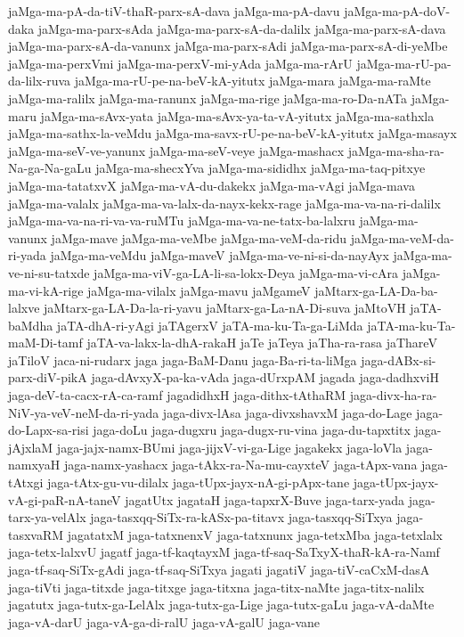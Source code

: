 {jaMga-ma-pA-da-tiV-thaR-parx-sA-dava
jaMga-ma-pA-davu
jaMga-ma-pA-doV-daka
jaMga-ma-parx-sAda
jaMga-ma-parx-sA-da-dalilx
jaMga-ma-parx-sA-dava
jaMga-ma-parx-sA-da-vanunx
jaMga-ma-parx-sAdi
jaMga-ma-parx-sA-di-yeMbe
jaMga-ma-perxVmi
jaMga-ma-perxV-mi-yAda
jaMga-ma-rArU
jaMga-ma-rU-pa-da-lilx-ruva
jaMga-ma-rU-pe-na-beV-kA-yitutx
jaMga-mara
jaMga-ma-raMte
jaMga-ma-ralilx
jaMga-ma-ranunx
jaMga-ma-rige
jaMga-ma-ro-Da-nATa
jaMga-maru
jaMga-ma-sAvx-yata
jaMga-ma-sAvx-ya-ta-vA-yitutx
jaMga-ma-sathxla
jaMga-ma-sathx-la-veMdu
jaMga-ma-savx-rU-pe-na-beV-kA-yitutx
jaMga-masayx
jaMga-ma-seV-ve-yanunx
jaMga-ma-seV-veye
jaMga-mashacx
jaMga-ma-sha-ra-Na-ga-Na-gaLu
jaMga-ma-shecxYva
jaMga-ma-sididhx
jaMga-ma-taq-pitxye
jaMga-ma-tatatxvX
jaMga-ma-vA-du-dakekx
jaMga-ma-vAgi
jaMga-mava
jaMga-ma-valalx
jaMga-ma-va-lalx-da-nayx-kekx-rage
jaMga-ma-va-na-ri-dalilx
jaMga-ma-va-na-ri-va-va-ruMTu
jaMga-ma-va-ne-tatx-ba-lalxru
jaMga-ma-vanunx
jaMga-mave
jaMga-ma-veMbe
jaMga-ma-veM-da-ridu
jaMga-ma-veM-da-ri-yada
jaMga-ma-veMdu
jaMga-maveV
jaMga-ma-ve-ni-si-da-nayAyx
jaMga-ma-ve-ni-su-tatxde
jaMga-ma-viV-ga-LA-li-sa-lokx-Deya
jaMga-ma-vi-cAra
jaMga-ma-vi-kA-rige
jaMga-ma-vilalx
jaMga-mavu
jaMgameV
jaMtarx-ga-LA-Da-ba-lalxve
jaMtarx-ga-LA-Da-la-ri-yavu
jaMtarx-ga-La-nA-Di-suva
jaMtoVH
jaTA-baMdha
jaTA-dhA-ri-yAgi
jaTAgerxV
jaTA-ma-ku-Ta-ga-LiMda
jaTA-ma-ku-Ta-maM-Di-tamf
jaTA-va-lakx-la-dhA-rakaH
jaTe
jaTeya
jaTha-ra-rasa
jaThareV
jaTiloV
jaca-ni-rudarx
jaga
jaga-BaM-Danu
jaga-Ba-ri-ta-liMga
jaga-dABx-si-parx-diV-pikA
jaga-dAvxyX-pa-ka-vAda
jaga-dUrxpAM
jagada
jaga-dadhxviH
jaga-deV-ta-cacx-rA-ca-ramf
jagadidhxH
jaga-dithx-tAthaRM
jaga-divx-ha-ra-NiV-ya-veV-neM-da-ri-yada
jaga-divx-lAsa
jaga-divxshavxM
jaga-do-Lage
jaga-do-Lapx-sa-risi
jaga-doLu
jaga-dugxru
jaga-dugx-ru-vina
jaga-du-tapxtitx
jaga-jAjxlaM
jaga-jajx-namx-BUmi
jaga-jijxV-vi-ga-Lige
jagakekx
jaga-loVla
jaga-namxyaH
jaga-namx-yashacx
jaga-tAkx-ra-Na-mu-cayxteV
jaga-tApx-vana
jaga-tAtxgi
jaga-tAtx-gu-vu-dilalx
jaga-tUpx-jayx-nA-gi-pApx-tane
jaga-tUpx-jayx-vA-gi-paR-nA-taneV
jagatUtx
jagataH
jaga-tapxrX-Buve
jaga-tarx-yada
jaga-tarx-ya-velAlx
jaga-tasxqq-SiTx-ra-kASx-pa-titavx
jaga-tasxqq-SiTxya
jaga-tasxvaRM
jagatatxM
jaga-tatxnenxV
jaga-tatxnunx
jaga-tetxMba
jaga-tetxlalx
jaga-tetx-lalxvU
jagatf
jaga-tf-kaqtayxM
jaga-tf-saq-SaTxyX-thaR-kA-ra-Namf
jaga-tf-saq-SiTx-gAdi
jaga-tf-saq-SiTxya
jagati
jagatiV
jaga-tiV-caCxM-dasA
jaga-tiVti
jaga-titxde
jaga-titxge
jaga-titxna
jaga-titx-naMte
jaga-titx-nalilx
jagatutx
jaga-tutx-ga-LelAlx
jaga-tutx-ga-Lige
jaga-tutx-gaLu
jaga-vA-daMte
jaga-vA-darU
jaga-vA-ga-di-ralU
jaga-vA-galU
jaga-vane
}
